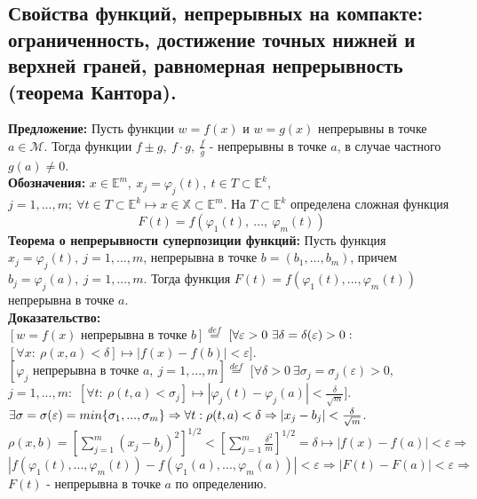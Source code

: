 \documentclass[a4paper,14pt]{extreport}
\begin{document}
\subsection*{Свойства функций, непрерывных на компакте: ограниченность, достижение точных нижней и верхней граней, равномерная непрерывность (теорема Кантора).}
\textbf{Предложение:} Пусть функции $w = f(x)$ и $w = g(x)$ непрерывны в точке $a \in \mathscr{M}$. Тогда функции $f \pm g, ~ f\cdot g, ~ \frac{f}{g} \text{ - непрерывны в точке } a$, 
в случае частного $g(a) \neq 0$.
\\[2mm]\textbf{Обозначения:} $x \in \mathbb{E}^m, ~ x_j = \varphi_j(t), ~t \in T \subset \mathbb{E}^k$,
$j = 1, ..., m;~\forall t \in T \subset \mathbb{E}^k \mapsto x \in \mathbb{X} \subset \mathbb{E}^m$.
На $T \subset \mathbb{E}^k$ определена сложная функция $$F(t) = f(\varphi_1(t),~ ..., ~\varphi_m(t))$$
\textbf{Теорема о непрерывности суперпозиции функций:} Пусть функция $x_j = \varphi_j(t),~ j = 1, ..., m$,
непрерывна в точке $b = (b_1, ..., b_m)$, причем $b_j = \varphi_j(a), ~ j = 1, ..., m$.
Тогда функция $F(t) = f(\varphi_1(t), ..., \varphi_m(t))$ непрерывна в точке $a$.
\\[2mm]\textbf{Доказательство:}\\ $[w = f(x) \text{ непрерывна в точке } b] \stackrel{def}{=}$ $[\forall \varepsilon > 0~\exists\delta = \delta(\varepsilon) > 0:\\$
$[\forall x: ~  \rho (x, a) < \delta] \mapsto |f(x) - f(b)| < \varepsilon]$.
\\$[\varphi_j \text{ непрерывна в точке } a, ~ j = 1, ..., m] \stackrel{def}{=}$ $[\forall \delta > 0~\exists\sigma_j = \sigma_j(\varepsilon) > 0,$\\[2mm] $j = 1, ..., m:$
$[\forall t: ~ \rho (t, a) < \sigma_j] \mapsto |\varphi_j(t) - \varphi_j(a)| < \frac{\delta}{\sqrt{m}}]$.
$\\[2mm]\exists \sigma = \sigma(\varepsilon) = min\{\sigma_1, ..., \sigma_m\} \Rightarrow \forall t: \rho(t, a) < \delta \Rightarrow |x_j - b_j| < \frac{\delta}{\sqrt{m}}$.
\\[2mm]$\rho(x, b) = \left[\sum\limits_{j = 1}^{m}(x_j - b_j)^2\right]^{1/2} < \left[\sum\limits_{j = 1}^{m}\frac{\delta^2}{m}\right]^{1/2} = \delta \mapsto |f(x) - f(a)| < \varepsilon \Rightarrow$
\\[2mm]$|f(\varphi_1(t), ..., \varphi_m(t)) - f(\varphi_1(a), ..., \varphi_m(a))| < \varepsilon \Rightarrow |F(t) - F(a)| < \varepsilon \Rightarrow$ 
\\[4mm]$F(t)$ - непрерывна в точке $a$ по определению.
\end{document}
